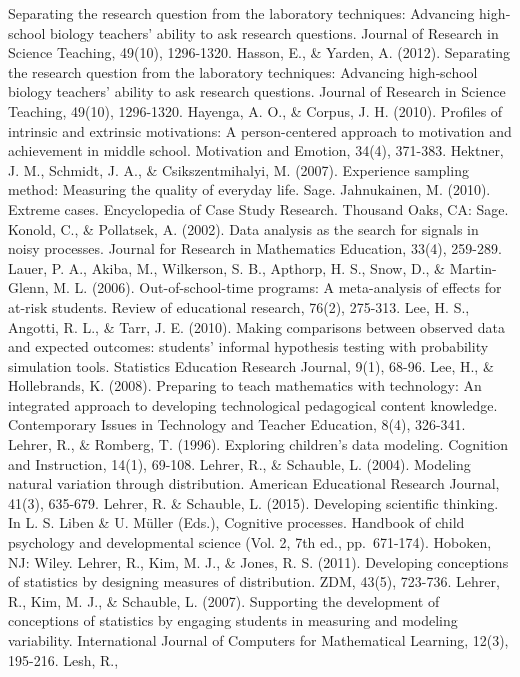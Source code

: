 \documentclass[]{book}
\theoremstyle{definition}
\theoremstyle{definition}
\theoremstyle{definition}
\theoremstyle{remark}
\begin{document}
Separating the research question from the laboratory techniques:
Advancing high‐school biology teachers' ability to ask research
questions. Journal of Research in Science Teaching, 49(10), 1296-1320.
Hasson, E., \& Yarden, A. (2012). Separating the research question from
the laboratory techniques: Advancing high‐school biology teachers'
ability to ask research questions. Journal of Research in Science
Teaching, 49(10), 1296-1320. Hayenga, A. O., \& Corpus, J. H. (2010).
Profiles of intrinsic and extrinsic motivations: A person-centered
approach to motivation and achievement in middle school. Motivation and
Emotion, 34(4), 371-383. Hektner, J. M., Schmidt, J. A., \&
Csikszentmihalyi, M. (2007). Experience sampling method: Measuring the
quality of everyday life. Sage. Jahnukainen, M. (2010). Extreme cases.
Encyclopedia of Case Study Research. Thousand Oaks, CA: Sage. Konold,
C., \& Pollatsek, A. (2002). Data analysis as the search for signals in
noisy processes. Journal for Research in Mathematics Education, 33(4),
259-289. Lauer, P. A., Akiba, M., Wilkerson, S. B., Apthorp, H. S.,
Snow, D., \& Martin-Glenn, M. L. (2006). Out-of-school-time programs: A
meta-analysis of effects for at-risk students. Review of educational
research, 76(2), 275-313. Lee, H. S., Angotti, R. L., \& Tarr, J. E.
(2010). Making comparisons between observed data and expected outcomes:
students' informal hypothesis testing with probability simulation tools.
Statistics Education Research Journal, 9(1), 68-96. Lee, H., \&
Hollebrands, K. (2008). Preparing to teach mathematics with technology:
An integrated approach to developing technological pedagogical content
knowledge. Contemporary Issues in Technology and Teacher Education,
8(4), 326-341. Lehrer, R., \& Romberg, T. (1996). Exploring children's
data modeling. Cognition and Instruction, 14(1), 69-108. Lehrer, R., \&
Schauble, L. (2004). Modeling natural variation through distribution.
American Educational Research Journal, 41(3), 635-679. Lehrer, R. \&
Schauble, L. (2015). Developing scientific thinking. In L. S. Liben \&
U. Müller (Eds.), Cognitive processes. Handbook of child psychology and
developmental science (Vol. 2, 7th ed., pp.~671-174). Hoboken, NJ:
Wiley. Lehrer, R., Kim, M. J., \& Jones, R. S. (2011). Developing
conceptions of statistics by designing measures of distribution. ZDM,
43(5), 723-736. Lehrer, R., Kim, M. J., \& Schauble, L. (2007).
Supporting the development of conceptions of statistics by engaging
students in measuring and modeling variability. International Journal of
Computers for Mathematical Learning, 12(3), 195-216. Lesh, R.,
\end{document}

